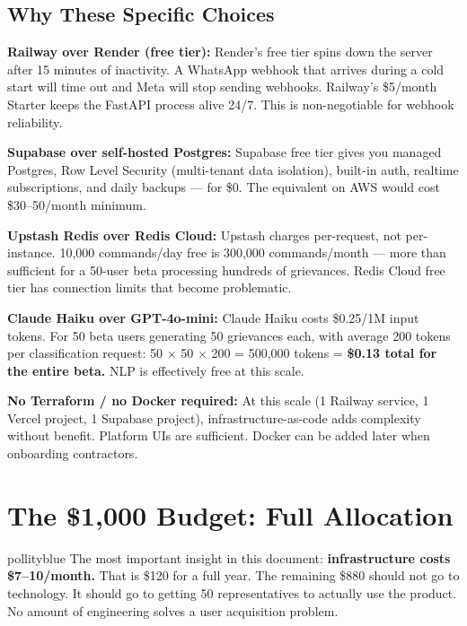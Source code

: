 \documentclass[12pt, a4paper]{article}
\begin{document}
\subsection{Why These Specific Choices}

\textbf{Railway over Render (free tier):}
Render's free tier spins down the server after 15 minutes of inactivity. A WhatsApp webhook that arrives during a cold start will time out and Meta will stop sending webhooks. Railway's \$5/month Starter keeps the FastAPI process alive 24/7. This is non-negotiable for webhook reliability.

\textbf{Supabase over self-hosted Postgres:}
Supabase free tier gives you managed Postgres, Row Level Security (multi-tenant data isolation), built-in auth, realtime subscriptions, and daily backups --- for \$0. The equivalent on AWS would cost \$30--50/month minimum.

\textbf{Upstash Redis over Redis Cloud:}
Upstash charges per-request, not per-instance. 10,000 commands/day free is 300,000 commands/month --- more than sufficient for a 50-user beta processing hundreds of grievances. Redis Cloud free tier has connection limits that become problematic.

\textbf{Claude Haiku over GPT-4o-mini:}
Claude Haiku costs \$0.25/1M input tokens. For 50 beta users generating 50 grievances each, with average 200 tokens per classification request: 50 $\times$ 50 $\times$ 200 = 500,000 tokens = \textbf{\$0.13 total for the entire beta.} NLP is effectively free at this scale.

\textbf{No Terraform / no Docker required:}
At this scale (1 Railway service, 1 Vercel project, 1 Supabase project), infrastructure-as-code adds complexity without benefit. Platform UIs are sufficient. Docker can be added later when onboarding contractors.

\newpage

\section{The \$1,000 Budget: Full Allocation}

\begin{insightbox}{pollityblue}
The most important insight in this document: \textbf{infrastructure costs \$7--10/month.}
That is \$120 for a full year. The remaining \$880 should not go to technology.
It should go to getting 50 representatives to actually use the product.
No amount of engineering solves a user acquisition problem.
\end{insightbox}
\end{document}
